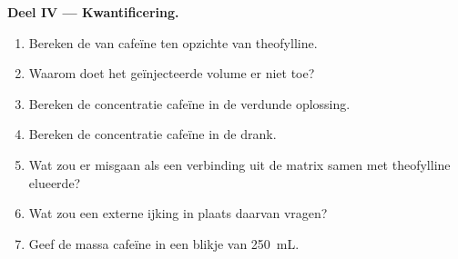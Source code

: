 \begin{problem}
\medskip
\noindent\textbf{Deel IV --- Kwantificering.}
\begin{enumerate}[resume]
  \item Bereken de  van cafeïne ten opzichte van theofylline.
  \item Waarom doet het geïnjecteerde volume er niet toe?
  \item Bereken de concentratie cafeïne in de verdunde oplossing.
  \item Bereken de concentratie cafeïne in de drank.
  \item Wat zou er misgaan als een verbinding uit de matrix samen met theofylline elueerde?
  \item Wat zou een externe ijking in plaats daarvan vragen?
  \item Geef de massa cafeïne in een blikje van \qty{250}{mL}.
\end{enumerate}
\end{problem}
